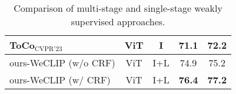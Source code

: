 \begin{table}[ht]
\begin{tabular}{l c c c c}
        ToCo$_{\text{CVPR'23}}$~\cite{40}                                   & ViT        & I    & 71.1          & 72.2          \\
        \hline
        ours-WeCLIP (w/o CRF)                                               & ViT        & I+L  & 74.9          & 75.2          \\
        ours-WeCLIP (w/ CRF)                                                & ViT        & I+L  & \textbf{76.4} & \textbf{77.2} \\
        \hline
    \end{tabular}
    \caption{Comparison of multi-stage and single-stage weakly supervised approaches.}
    \label{tab:quantitative_results}
\end{table}


